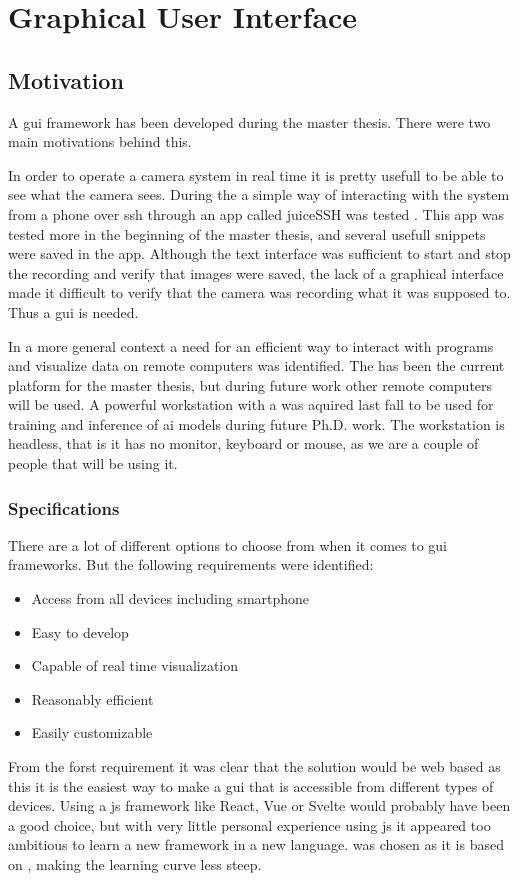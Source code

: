 \chapter{Graphical User Interface}


\section{Motivation}
A \gls{gui} framework has been developed during the master thesis.
There were two main motivations behind this.

In order to operate a camera system in real time it is pretty usefull to be able to see what the camera sees.
During the \preproject a simple way of interacting with the system from a phone over \gls{ssh} through an app called juiceSSH was tested \cite[32]{martensPortableSensorRig2022}.
This app was tested more in the beginning of the master thesis, and several usefull snippets were saved in the app.
Although the text interface was sufficient to start and stop the recording and verify that images were saved, the lack of a graphical interface made it difficult to verify that the camera was recording what it was supposed to.
Thus a \gls{gui} is needed.

In a more general context a need for an efficient way to interact with programs and visualize data on remote computers was identified.
The \jx has been the current platform for the master thesis, but during future work other remote computers will be used.
A powerful workstation with a \todo was aquired last fall to be used for training and inference of \gls{ai} models during future Ph.D.
work.
The workstation is headless, that is it has no monitor, keyboard or mouse, as we are a couple of people that will be using it.

\subsection{Specifications}
There are a lot of different options to choose from when it comes to \gls{gui} frameworks.
But the following requirements were identified:
\begin{itemize}
    \item Access from all devices including smartphone
    \item Easy to develop
    \item Capable of real time visualization
    \item Reasonably efficient
    \item Easily customizable
\end{itemize}
From the forst requirement it was clear that the solution would be web based as this it is the easiest way to make a \gls{gui} that is accessible from different types of devices.
Using a \gls{js} framework like React, Vue or Svelte would probably have been a good choice, but with very little personal experience using \gls{js} it appeared too ambitious to learn a new framework in a new language.
\dash was chosen as it is based on \py, making the learning curve less steep.


